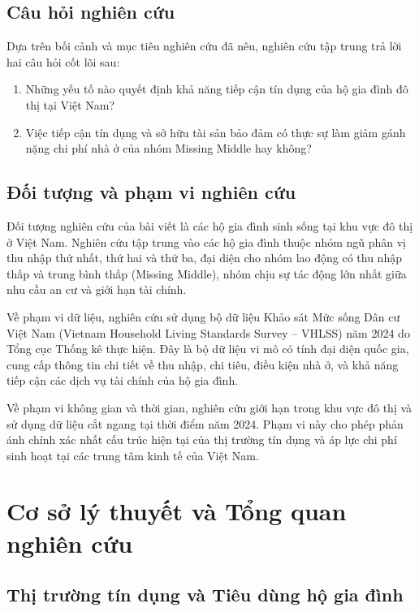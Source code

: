 \documentclass[12pt,a4paper]{report}
\begin{document}
	\section{Câu hỏi nghiên cứu}
	
	Dựa trên bối cảnh và mục tiêu nghiên cứu đã nêu, nghiên cứu tập trung trả lời hai câu hỏi cốt lõi sau:
	
	\begin{enumerate}
		\item Những yếu tố nào quyết định khả năng tiếp cận tín dụng của hộ gia đình đô thị tại Việt Nam?
		
		\item Việc tiếp cận tín dụng và sở hữu tài sản bảo đảm có thực sự làm giảm gánh nặng chi phí nhà ở của nhóm Missing Middle hay không?
	\end{enumerate}
	
	\section{Đối tượng và phạm vi nghiên cứu}
	
	Đối tượng nghiên cứu của bài viết là các hộ gia đình sinh sống tại khu vực đô thị ở Việt Nam. Nghiên cứu tập trung vào các hộ gia đình thuộc nhóm ngũ phân vị thu nhập thứ nhất, thứ hai và thứ ba, đại diện cho nhóm lao động có thu nhập thấp và trung bình thấp (Missing Middle), nhóm chịu sự tác động lớn nhất giữa nhu cầu an cư và giới hạn tài chính.
	
	Về phạm vi dữ liệu, nghiên cứu sử dụng bộ dữ liệu Khảo sát Mức sống Dân cư Việt Nam (Vietnam Household Living Standards Survey -- VHLSS) năm 2024 \parencite{VHLSS2024} do Tổng cục Thống kê thực hiện. Đây là bộ dữ liệu vi mô có tính đại diện quốc gia, cung cấp thông tin chi tiết về thu nhập, chi tiêu, điều kiện nhà ở, và khả năng tiếp cận các dịch vụ tài chính của hộ gia đình.
	
	Về phạm vi không gian và thời gian, nghiên cứu giới hạn trong khu vực đô thị và sử dụng dữ liệu cắt ngang tại thời điểm năm 2024. Phạm vi này cho phép phản ánh chính xác nhất cấu trúc hiện tại của thị trường tín dụng và áp lực chi phí sinh hoạt tại các trung tâm kinh tế của Việt Nam.

\chapter{Cơ sở lý thuyết và Tổng quan nghiên cứu}

\section{Thị trường tín dụng và Tiêu dùng hộ gia đình}
\end{document}
